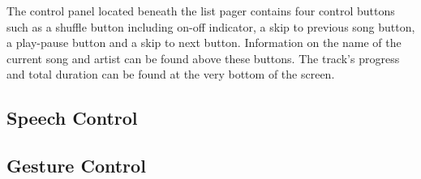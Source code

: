 The control panel located beneath the list pager contains four control buttons such as a shuffle button including on-off indicator, a skip to previous song button, a play-pause button and a skip to next button. Information on the name of the current song and artist can be found above these buttons. The track's progress and total duration can be found at the very bottom of the screen.


\subsection{Speech Control}

\subsection{Gesture Control}







